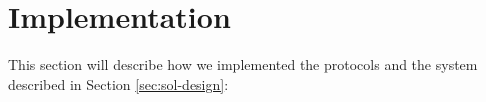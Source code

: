 \section{Implementation}\label{sec:implementation}

This section will describe how we implemented the protocols and the system
described in Section \ref{sec:sol-design}:









